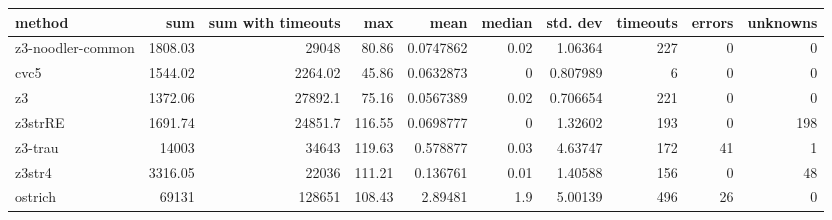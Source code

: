 \begin{tabular}{lrrrrrrrrr}
\hline
 method            &      sum &   sum with timeouts &    max &      mean &   median &   std. dev &   timeouts &   errors &   unknowns \\
\hline
 z3-noodler-common &  1808.03 &            29048    &  80.86 & 0.0747862 &     0.02 &   1.06364  &        227 &        0 &          0 \\
 cvc5              &  1544.02 &             2264.02 &  45.86 & 0.0632873 &     0    &   0.807989 &          6 &        0 &          0 \\
 z3                &  1372.06 &            27892.1  &  75.16 & 0.0567389 &     0.02 &   0.706654 &        221 &        0 &          0 \\
 z3strRE           &  1691.74 &            24851.7  & 116.55 & 0.0698777 &     0    &   1.32602  &        193 &        0 &        198 \\
 z3-trau           & 14003    &            34643    & 119.63 & 0.578877  &     0.03 &   4.63747  &        172 &       41 &          1 \\
 z3str4            &  3316.05 &            22036    & 111.21 & 0.136761  &     0.01 &   1.40588  &        156 &        0 &         48 \\
 ostrich           & 69131    &           128651    & 108.43 & 2.89481   &     1.9  &   5.00139  &        496 &       26 &          0 \\
\hline
\end{tabular}
